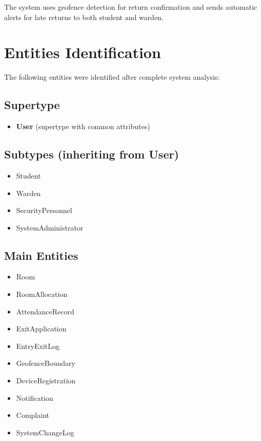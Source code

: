 \documentclass[12pt,a4paper]{article}
\begin{document}
The system uses geofence detection for return confirmation and sends automatic alerts for late returns to both student and warden.

\section{Entities Identification}

The following entities were identified after complete system analysis:

\subsection{Supertype}
\begin{itemize}
    \item \textbf{User} (supertype with common attributes)
\end{itemize}

\subsection{Subtypes (inheriting from User)}
\begin{itemize}
    \item Student
    \item Warden
    \item SecurityPersonnel
    \item SystemAdministrator
\end{itemize}

\subsection{Main Entities}
\begin{itemize}
    \item Room
    \item RoomAllocation
    \item AttendanceRecord
    \item ExitApplication
    \item EntryExitLog
    \item GeofenceBoundary
    \item DeviceRegistration
    \item Notification
    \item Complaint
    \item SystemChangeLog
\end{itemize}
\end{document}

